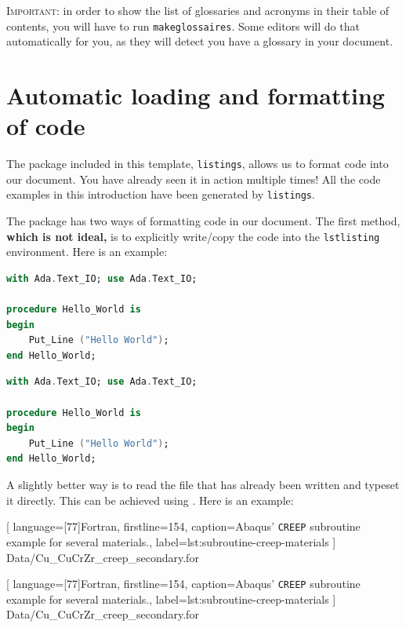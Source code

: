 \textsc{\color{red}Important:} in order to show the list of glossaries and acronyms in their table of contents, you will have to run \verb|makeglossaires|. Some editors will do that automatically for you, as they will detect you have a glossary in your document.

\section{Automatic loading and formatting of code}

The package included in this template, \verb|listings|, allows us to format code into our document. You have already seen it in action multiple times! All the code examples in this introduction have been generated by \verb|listings|.

The package has two ways of formatting code in our document. The first method, \textbf{which is not ideal,} is to explicitly write/copy the code into the \verb|lstlisting| environment. Here is an example:

\begin{lstlisting}[language=Ada, caption={Hello world in Ada}, label={lst:hello-world-ada}]
with Ada.Text_IO; use Ada.Text_IO;

procedure Hello_World is
begin
    Put_Line ("Hello World");
end Hello_World;
\end{lstlisting}


\begin{TeXlstlisting}
\begin{lstlisting}[language=Ada, caption={Hello world in Ada}, label={lst:hello-world-ada}]
with Ada.Text_IO; use Ada.Text_IO;

procedure Hello_World is
begin
    Put_Line ("Hello World");
end Hello_World;
\end{lstlisting}
\end{TeXlstlisting}

A slightly better way is to read the file that has already been written and typeset it directly. This can be achieved using \verb||. Here is an example:


[
language={[77]Fortran},
firstline=154,
caption={Abaqus' \texttt{CREEP} subroutine example for several materials.},
label={lst:subroutine-creep-materials}
]
{Data/Cu_CuCrZr_creep_secondary.for}

\begin{TeXlstlisting}

[
language={[77]Fortran},
firstline=154,
caption={Abaqus' \texttt{CREEP} subroutine example for several materials.},
label={lst:subroutine-creep-materials}
]
{Data/Cu_CuCrZr_creep_secondary.for}
\end{TeXlstlisting}


